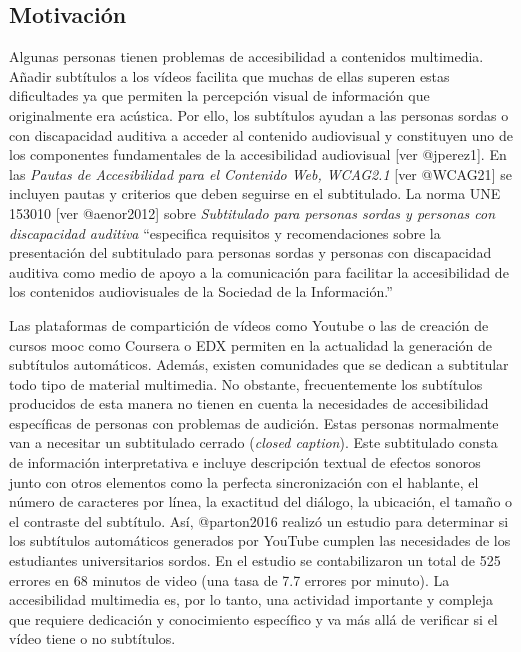 \documentclass[
  letterpaper,
  DIV=11,
  numbers=noendperiod]{scrartcl}
\author{}
\date{}
\begin{document}
\ifdefined\Shaded\renewenvironment{Shaded}{\begin{tcolorbox}[breakable, interior hidden, borderline west={3pt}{0pt}{shadecolor}, frame hidden, boxrule=0pt, sharp corners, enhanced]}{\end{tcolorbox}}\fi

\hypertarget{motivaciuxf3n}{%
\subsection{Motivación}\label{motivaciuxf3n}}

Algunas personas tienen problemas de \gls{accesibilidad} a contenidos
multimedia. Añadir subtítulos a los vídeos facilita que muchas de ellas
superen estas dificultades ya que permiten la percepción visual de
información que originalmente era acústica. Por ello, los subtítulos
ayudan a las personas sordas o con discapacidad auditiva a acceder al
contenido audiovisual y constituyen uno de los componentes fundamentales
de la accesibilidad audiovisual {[}ver @jperez1{]}. En las \emph{Pautas
de Accesibilidad para el Contenido Web, WCAG2.1} {[}ver @WCAG21{]} se
incluyen pautas y criterios que deben seguirse en el subtitulado. La
norma UNE 153010 {[}ver @aenor2012{]} sobre \emph{Subtitulado para
personas sordas y personas con discapacidad auditiva} ``especifica
requisitos y recomendaciones sobre la presentación del subtitulado para
personas sordas y personas con discapacidad auditiva como medio de apoyo
a la comunicación para facilitar la accesibilidad de los contenidos
audiovisuales de la Sociedad de la Información.''

Las plataformas de compartición de vídeos como Youtube o las de creación
de cursos \gls{mooc} como Coursera o EDX permiten en la actualidad la
generación de subtítulos automáticos. Además, existen comunidades que se
dedican a subtitular todo tipo de material multimedia. No obstante,
frecuentemente los subtítulos producidos de esta manera no tienen en
cuenta la necesidades de accesibilidad específicas de personas con
problemas de audición. Estas personas normalmente van a necesitar un
\gls{subtitulado cerrado} (\emph{closed caption}). Este subtitulado
consta de información interpretativa e incluye descripción textual de
efectos sonoros junto con otros elementos como la perfecta
sincronización con el hablante, el número de caracteres por línea, la
exactitud del diálogo, la ubicación, el tamaño o el contraste del
subtítulo. Así, @parton2016 realizó un estudio para determinar si los
subtítulos automáticos generados por YouTube cumplen las necesidades de
los estudiantes universitarios sordos. En el estudio se contabilizaron
un total de 525 errores en 68 minutos de video (una tasa de 7.7 errores
por minuto). La accesibilidad multimedia es, por lo tanto, una actividad
importante y compleja que requiere dedicación y conocimiento específico
y va más allá de verificar si el vídeo tiene o no subtítulos.
\end{document}
